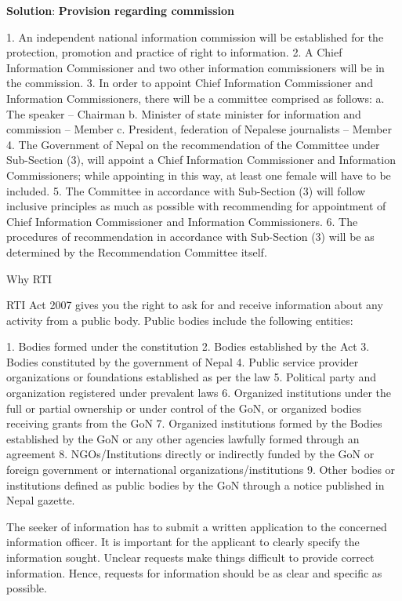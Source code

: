 \documentclass[
  openany]{book}
\newenvironment{solution}{ {\bfseries Solution}:}{}
\begin{document}
\begin{questions}
\begin{solution}
\textbf{Provision regarding commission}

1. An independent national information commission will be established for the protection, promotion and practice of right to information.
2. A Chief Information Commissioner and two other information commissioners will be in the commission.
3. In order to appoint Chief Information Commissioner and Information Commissioners, there will be a committee comprised as follows:
  a. The speaker -- Chairman
  b. Minister of state minister for information and commission -- Member
  c. President, federation of Nepalese journalists -- Member
4. The Government of Nepal on the recommendation of the Committee under Sub-Section (3), will appoint a Chief Information Commissioner and Information Commissioners; while appointing in this way, at least one female will have to be included.
5. The Committee in accordance with Sub-Section (3) will follow inclusive principles as much as possible with recommending for appointment of Chief Information Commissioner and Information Commissioners.
6. The procedures of recommendation in accordance with Sub-Section (3) will be as determined by the Recommendation Committee itself.

Why RTI

RTI Act 2007 gives you the right to ask for and receive information about any activity from a public body. Public bodies include the following entities:

1. Bodies formed under the constitution
2. Bodies established by the Act
3. Bodies constituted by the government of Nepal
4. Public service provider organizations or foundations established as per the law
5. Political party and organization registered under prevalent laws
6. Organized institutions under the full or partial ownership or under control of the GoN, or organized bodies receiving grants from the GoN
7. Organized institutions formed by the Bodies established by the GoN or any other agencies lawfully formed through an agreement
8. NGOs/Institutions directly or indirectly funded by the GoN or foreign government or international organizations/institutions
9. Other bodies or institutions defined as public bodies by the GoN through a notice published in Nepal gazette.

The seeker of information has to submit a written application to the concerned information officer. It is important for the applicant to clearly specify the information sought. Unclear requests make things difficult to provide correct information. Hence, requests for information should be as clear and specific as possible.


\end{solution}
\end{questions}
\end{document}
